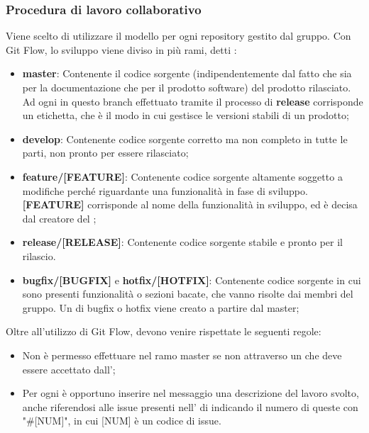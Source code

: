 \subsubsection{Procedura di lavoro collaborativo}
Viene scelto di utilizzare il modello  per ogni repository gestito dal gruppo.
Con Git Flow, lo sviluppo viene diviso in più rami, detti :
\begin{itemize}
	\item \textbf{master}: Contenente il codice sorgente (indipendentemente dal fatto che sia per la documentazione che per il prodotto software) del prodotto rilasciato.
	Ad ogni  in questo branch effettuato tramite il processo di \textbf{release} corrisponde un etichetta, che è il modo in cui  gestisce le versioni stabili di un prodotto;
	\item \textbf{develop}: Contenente codice sorgente corretto ma non completo in tutte le parti, non pronto per essere rilasciato;
	\item \textbf{feature/[FEATURE]}: Contenente codice sorgente altamente soggetto a modifiche perché riguardante una funzionalità in fase di sviluppo.
	\textbf{[FEATURE]} corrisponde al nome della funzionalità in sviluppo, ed è decisa dal creatore del ;
	\item \textbf{release/[RELEASE]}: Contenente codice sorgente stabile e pronto per il rilascio.
	\item \textbf{bugfix/[BUGFIX]} e \textbf{hotfix/[HOTFIX]}: Contenente codice sorgente in cui sono presenti funzionalità o sezioni bacate, che vanno risolte dai membri del gruppo.
	Un  di bugfix o hotfix viene creato a partire dal  master;
\end{itemize}

Oltre all'utilizzo di Git Flow, devono venire rispettate le seguenti regole:
\begin{itemize}
	\item Non è permesso effettuare  nel ramo master se non attraverso un  che deve essere accettato dall’\Amministratore{};
	\item Per ogni  è opportuno inserire nel messaggio una descrizione del lavoro svolto, anche riferendosi alle issue presenti nell' di  indicando il numero di queste con "#[NUM]", in cui [NUM] è un codice di issue.
\end{itemize}
